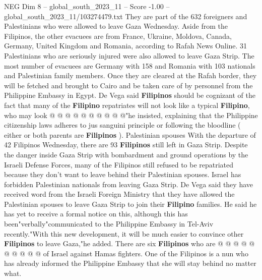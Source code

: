 \begin{textsample}{NEG Dim 8 – global\_south\_2023\_11 – Score -1.00 – global\_south\_2023\_11/103274479.txt}
They are part of the 632 foreigners and Palestinians who were allowed to leave Gaza Wednesday.
Aside from the Filipinos, the other evacuees are from France, Ukraine, Moldova, Canada, Germany, United Kingdom and Romania, according to Rafah News Online. 31 Palestinians who are seriously injured were also allowed to leave Gaza Strip.
The most number of evacuees are Germany with 158 and Romania with 103 nationals and Palestinian family members.
Once they are cleared at the Rafah border, they will be fetched and brought to Cairo and be taken care of by personnel from the Philippine Embassy in Egypt.
De Vega said \textbf{Filipinos} should be cognizant of the fact that many of the \textbf{Filipino} repatriates will not look like a typical \textbf{Filipino}, who may look @ @ @ @ @ @ @ @ @ @"he insisted, explaining that the Philippine citizenship laws adheres to jus sanguini principle or following the bloodline ( either or both parents are \textbf{Filipinos} ).
Palestinian spouses With the departure of 42 Filipinos Wednesday, there are 93 \textbf{Filipinos} still left in Gaza Strip.
Despite the danger inside Gaza Strip with bombardment and ground operations by the Israeli Defense Forces, many of the Filipinos still refused to be repatriated because they don't want to leave behind their Palestinian spouses.
Israel has forbidden Palestinian nationals from leaving Gaza Strip.
De Vega said they have received word from the Israeli Foreign Ministry that they have allowed the Palestinian spouses to leave Gaza Strip to join their \textbf{Filipino} families.
He said he has yet to receive a formal notice on this, although this has been"verbally"communicated to the Philippine Embassy in Tel-Aviv recently."With this new development, it will be much easier to convince other \textbf{Filipinos} to leave Gaza,"he added.
There are six \textbf{Filipinos} who are @ @ @ @ @ @ @ @ @ @ of Israel against Hamas fighters.
One of the Filipinos is a nun who has already informed the Philippine Embassy that she will stay behind no matter what.

\end{textsample}
